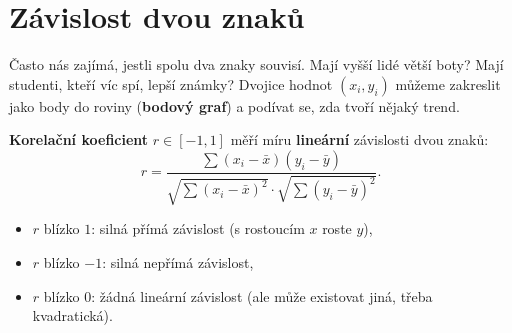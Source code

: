 \section{Závislost dvou znaků}\label{sec:zavislost-znaku}

Často nás zajímá, jestli spolu dva znaky souvisí. Mají vyšší lidé větší boty? Mají studenti, kteří víc spí, lepší známky? Dvojice hodnot $(x_i, y_i)$ můžeme zakreslit jako body do roviny (\textbf{bodový graf}) a podívat se, zda tvoří nějaký trend.

\begin{definitionbox}
  \textbf{Korelační koeficient} $r\in[-1, 1]$ měří míru \textbf{lineární} závislosti dvou znaků:
  \begin{equation*}
    r = \frac{\sum{(x_i - \bar{x})(y_i - \bar{y})}}{\sqrt{\sum{(x_i - \bar{x})}^2}\cdot\sqrt{\sum{(y_i - \bar{y})}^2}}.
  \end{equation*}
  \begin{itemize}
    \item $r$ blízko $1$: silná přímá závislost (s rostoucím $x$ roste $y$),
    \item $r$ blízko $-1$: silná nepřímá závislost,
    \item $r$ blízko $0$: žádná lineární závislost (ale může existovat jiná, třeba kvadratická).
  \end{itemize}
\end{definitionbox}

